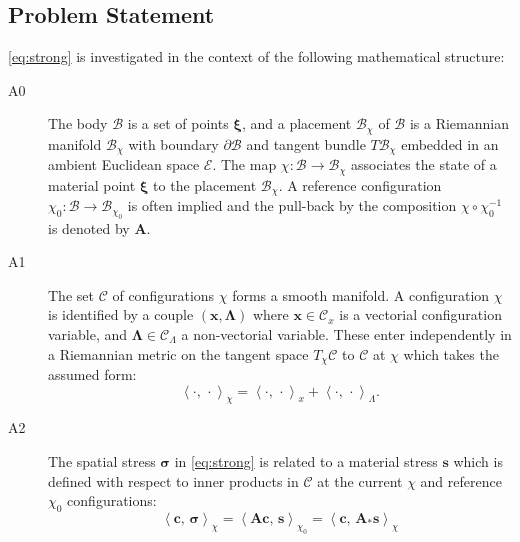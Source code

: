 \iffalse
\hypertarget{sec:statement}{%
\subsection{Problem Statement}\label{sec:statement}}

\eqref{eq:strong} is investigated in the context of the following
mathematical structure:

\begin{description}
\item[A0]
The body \(\mathcal{B}\) is a set of points \(\bm{\xi}\), and a placement
\(\mathcal{B}_\chi\) of \(\mathcal{B}\) is a Riemannian manifold
\(\mathcal{B}_\chi\) with boundary \(\partial \mathcal{B}\) and tangent
bundle \(T\mathcal{B}_\chi\) embedded in an ambient Euclidean space
\(\mathcal{E}\). The map
\(\chi\colon \mathcal{B}\rightarrow \mathcal{B}_\chi\) associates the
state of a material point \(\bm{\xi}\) to the placement
\(\mathcal{B}_\chi\). A reference configuration
\(\chi_0\colon \mathcal{B}\rightarrow \mathcal{B}_{\chi_0}\) is often
implied and the pull-back by the composition \(\chi\circ\chi_0^{-1}\) is
denoted by \(\bm{A}\).
\item[A1]
The set \(\mathscr{C}\) of configurations \(\chi\) forms a smooth
 manifold. A configuration \(\chi\) is identified by a couple
\((\bm{x}, \bm{\Lambda})\) where \(\bm{x}\in\mathscr{C}_x\) is a
vectorial configuration variable, and
\(\bm{\Lambda}\in\mathscr{C}_{\scriptscriptstyle{\Lambda}}\) a
non-vectorial variable. 
These enter independently in a Riemannian metric
on the tangent space \(T_\chi\mathscr{C}\) to \(\mathscr{C}\) at
\(\chi\) which takes the assumed form: 
\begin{equation}
  \left< \cdot , \, \cdot\right>_{\chi} = \left< \cdot , \, \cdot\right>_{x} + \left< \cdot , \, \cdot\right>_{\scriptscriptstyle{\Lambda}} .
  \label{eq:conf-pair}
\end{equation}
%
\item[A2]
The spatial stress \(\bm{\sigma}\) in \eqref{eq:strong} is related to a
material stress \(\bm{s}\) which is defined with respect to inner products 
in \(\mathscr{C}\) at the current \(\chi\) and reference
\(\chi_0\) configurations:
\begin{equation}
  \left<\bm{c},\, \bm{\sigma}\right>_{\chi}
  =\left< \bm{A}\bm{c},\, \bm{s}\right>_{\chi_0}
  = \left<\bm{c},\, \bm{A}_*\bm{s}\right>_{\chi}
  \label{eq:def-Astar}
\end{equation}

\end{description}
